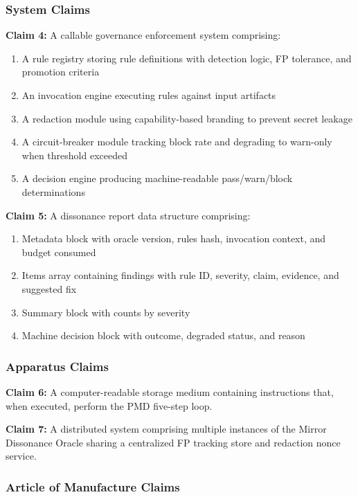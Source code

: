 \documentclass[11pt,a4paper]{article}
\begin{document}
\subsubsection{System Claims}

\textbf{Claim 4:} A callable governance enforcement system comprising:
\begin{enumerate}
\item A rule registry storing rule definitions with detection logic, FP tolerance, and promotion criteria
\item An invocation engine executing rules against input artifacts
\item A redaction module using capability-based branding to prevent secret leakage
\item A circuit-breaker module tracking block rate and degrading to warn-only when threshold exceeded
\item A decision engine producing machine-readable pass/warn/block determinations
\end{enumerate}

\textbf{Claim 5:} A dissonance report data structure comprising:
\begin{enumerate}
\item Metadata block with oracle version, rules hash, invocation context, and budget consumed
\item Items array containing findings with rule ID, severity, claim, evidence, and suggested fix
\item Summary block with counts by severity
\item Machine decision block with outcome, degraded status, and reason
\end{enumerate}

\subsubsection{Apparatus Claims}

\textbf{Claim 6:} A computer-readable storage medium containing instructions that, when executed, perform the PMD five-step loop.

\textbf{Claim 7:} A distributed system comprising multiple instances of the Mirror Dissonance Oracle sharing a centralized FP tracking store and redaction nonce service.

\subsubsection{Article of Manufacture Claims}
\end{document}
